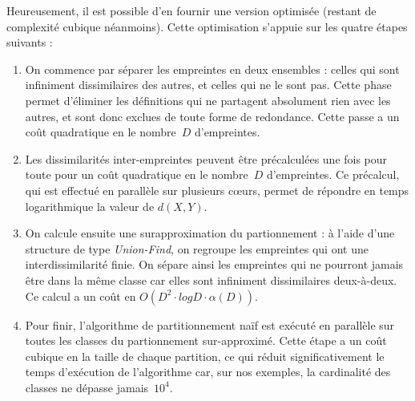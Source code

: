 Heureusement, il est possible d'en fournir une version optimisée
(restant de complexité cubique néanmoins). Cette optimisation
s'appuie sur les quatre étapes suivants :

\begin{enumerate}
\item
  On commence par séparer les empreintes en deux ensembles : celles
  qui sont infiniment dissimilaires des autres, et celles qui ne le
  sont pas. Cette phase permet d'éliminer les définitions qui ne
  partagent absolument rien avec les autres, et sont donc exclues de
  toute forme de redondance. Cette passe a un coût quadratique en le
  nombre~$D$ d'empreintes.
\item
  Les dissimilarités inter-empreintes peuvent être précalculées une
  fois pour toute pour un coût quadratique en le nombre~$D$
  d'empreintes.  Ce précalcul, qui est effectué en parallèle sur
  plusieurs c{\oe}urs, permet de répondre en temps logarithmique
  la valeur de $d(X, Y)$.
\item
  On calcule ensuite une surapproximation du partionnement : à l'aide
  d'une structure de type \textit{Union-Find}, on regroupe les
  empreintes qui ont une interdissimilarité finie. On sépare ainsi
  les empreintes qui ne pourront jamais être dans la même classe car
  elles sont infiniment dissimilaires deux-à-deux. Ce calcul a un coût
  en $O(D^2 \cdot log D \cdot \alpha(D))$. 
\item
  Pour finir, l'algorithme de partitionnement naïf est exécuté en
  parallèle sur toutes les classes du partionnement sur-approximé.
  Cette étape a un coût cubique en la taille de chaque partition, ce
  qui réduit significativement le temps d'exécution de l'algorithme
  car, sur nos exemples, la cardinalité des classes ne dépasse
  jamais~$10^4$.

\end{enumerate}
